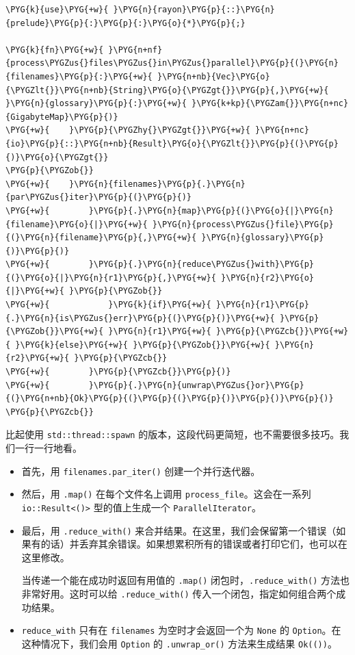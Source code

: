 \begin{Verbatim}[commandchars=\\\{\},breaklines=true,breakanywhere=true,fontsize=\codefont,xleftmargin=17bp]
\PYG{k}{use}\PYG{+w}{ }\PYG{n}{rayon}\PYG{p}{::}\PYG{n}{prelude}\PYG{p}{:}\PYG{p}{:}\PYG{o}{*}\PYG{p}{;}

\PYG{k}{fn}\PYG{+w}{ }\PYG{n+nf}{process\PYGZus{}files\PYGZus{}in\PYGZus{}parallel}\PYG{p}{(}\PYG{n}{filenames}\PYG{p}{:}\PYG{+w}{ }\PYG{n+nb}{Vec}\PYG{o}{\PYGZlt{}}\PYG{n+nb}{String}\PYG{o}{\PYGZgt{}}\PYG{p}{,}\PYG{+w}{ }\PYG{n}{glossary}\PYG{p}{:}\PYG{+w}{ }\PYG{k+kp}{\PYGZam{}}\PYG{n+nc}{GigabyteMap}\PYG{p}{)}
\PYG{+w}{    }\PYG{p}{\PYGZhy{}\PYGZgt{}}\PYG{+w}{ }\PYG{n+nc}{io}\PYG{p}{::}\PYG{n+nb}{Result}\PYG{o}{\PYGZlt{}}\PYG{p}{(}\PYG{p}{)}\PYG{o}{\PYGZgt{}}
\PYG{p}{\PYGZob{}}
\PYG{+w}{    }\PYG{n}{filenames}\PYG{p}{.}\PYG{n}{par\PYGZus{}iter}\PYG{p}{(}\PYG{p}{)}
\PYG{+w}{        }\PYG{p}{.}\PYG{n}{map}\PYG{p}{(}\PYG{o}{|}\PYG{n}{filename}\PYG{o}{|}\PYG{+w}{ }\PYG{n}{process\PYGZus{}file}\PYG{p}{(}\PYG{n}{filename}\PYG{p}{,}\PYG{+w}{ }\PYG{n}{glossary}\PYG{p}{)}\PYG{p}{)}
\PYG{+w}{        }\PYG{p}{.}\PYG{n}{reduce\PYGZus{}with}\PYG{p}{(}\PYG{o}{|}\PYG{n}{r1}\PYG{p}{,}\PYG{+w}{ }\PYG{n}{r2}\PYG{o}{|}\PYG{+w}{ }\PYG{p}{\PYGZob{}}
\PYG{+w}{            }\PYG{k}{if}\PYG{+w}{ }\PYG{n}{r1}\PYG{p}{.}\PYG{n}{is\PYGZus{}err}\PYG{p}{(}\PYG{p}{)}\PYG{+w}{ }\PYG{p}{\PYGZob{}}\PYG{+w}{ }\PYG{n}{r1}\PYG{+w}{ }\PYG{p}{\PYGZcb{}}\PYG{+w}{ }\PYG{k}{else}\PYG{+w}{ }\PYG{p}{\PYGZob{}}\PYG{+w}{ }\PYG{n}{r2}\PYG{+w}{ }\PYG{p}{\PYGZcb{}}
\PYG{+w}{        }\PYG{p}{\PYGZcb{}}\PYG{p}{)}
\PYG{+w}{        }\PYG{p}{.}\PYG{n}{unwrap\PYGZus{}or}\PYG{p}{(}\PYG{n+nb}{Ok}\PYG{p}{(}\PYG{p}{(}\PYG{p}{)}\PYG{p}{)}\PYG{p}{)}
\PYG{p}{\PYGZcb{}}
\end{Verbatim}

比起使用 \texttt{std::thread::spawn} 的版本，这段代码更简短，也不需要很多技巧。我们一行一行地看。

\begin{itemize}
\item 首先，用 \texttt{filenames.par\_iter()} 创建一个并行迭代器。
\item 然后，用 \texttt{.map()} 在每个文件名上调用 \texttt{process\_file}。这会在一系列 \texttt{io::Result<()>} 型的值上生成一个 \texttt{ParallelIterator}。
\item 最后，用 \texttt{.reduce\_with()} 来合并结果。在这里，我们会保留第一个错误（如果有的话）并丢弃其余错误。如果想累积所有的错误或者打印它们，也可以在这里修改。

当传递一个能在成功时返回有用值的 \texttt{.map()} 闭包时，\texttt{.reduce\_with()} 方法也非常好用。这时可以给 \texttt{.reduce\_with()} 传入一个闭包，指定如何组合两个成功结果。
\item \texttt{reduce\_with} 只有在 \texttt{filenames} 为空时才会返回一个为 \texttt{None} 的 \texttt{Option}。在这种情况下，我们会用 \texttt{Option} 的 \texttt{.unwrap\_or()} 方法来生成结果 \texttt{Ok(())}。
\end{itemize}


